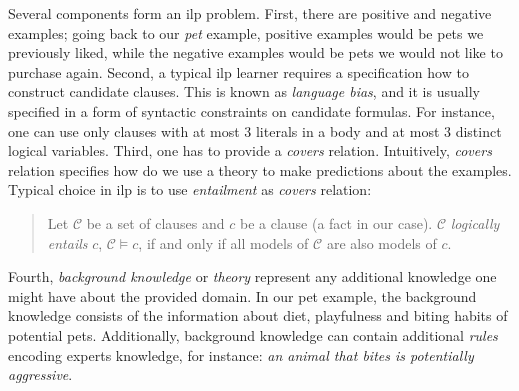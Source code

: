 %
%
%
%
%



Several components form an \gls{ilp} problem.
First, there are positive and negative examples; going back to our \textit{pet} example, positive examples would be pets we previously liked, while the negative examples would be pets we would not like to purchase again.
Second, a typical \gls{ilp} learner requires a specification how to construct candidate clauses.
This is known as \textit{language bias}, and it is usually specified in a form of syntactic constraints on candidate formulas.
For instance, one can use only clauses with at most 3 literals in a body and at most 3 distinct logical variables.
Third, one has to provide a \textit{covers} relation.
Intuitively, \textit{covers} relation specifies how do we use a theory to make predictions about the examples.
Typical choice in \gls{ilp} is to use \textit{entailment} as \textit{covers} relation:


\begin{quote}
	Let $\mathcal{C}$ be a set of clauses and $c$ be a clause (a fact in our case). $\mathcal{C}$ \textit{logically entails} $c$, $\mathcal{C} \models c$, if and only if all models of $\mathcal{C}$ are also models of $c$.
\end{quote}


Fourth, \textit{background knowledge} or \textit{theory} represent any additional knowledge one might have about the provided domain.
In our pet example, the background knowledge consists of the information about diet, playfulness and biting habits of potential pets.
Additionally, background knowledge can contain additional \textit{rules} encoding experts knowledge, for instance: \textit{an animal that bites is potentially aggressive}.




